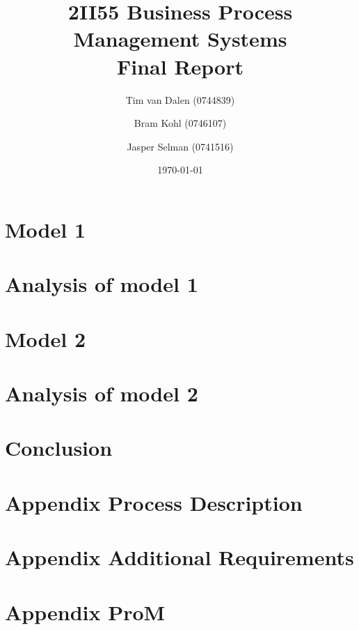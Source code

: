 \documentclass[11pt,a4paper]{article}
\title{
	{\huge 2II55 Business Process Management Systems}\\
	{\large Final Report}
}
\author{
	Tim van Dalen (0744839)
	\and
	Bram Kohl (0746107)
	\and
	Jasper Selman (0741516)
}
\date{\today}
\begin{document}
	\maketitle

	

	\section{Model 1}
	\label{sec:model1}
	

	\section{Analysis of model 1}
	\label{sec:analysis1}
	

	\section{Model 2}
	\label{sec:model2}
	

	\section{Analysis of model 2}
	\label{sec:analysis2}
	

	\section{Conclusion}
	\label{sec:conclusion}
	

	\newpage
	\begin{appendix}

	\section{Appendix Process Description}
	\label{app:appendix_exercise}
	
	
	

	\section{Appendix Additional Requirements}
	\label{app:appendix_additional}
	

	

	\section{Appendix ProM}
	\label{app:prom}
	
	\end{appendix}
\end{document}

